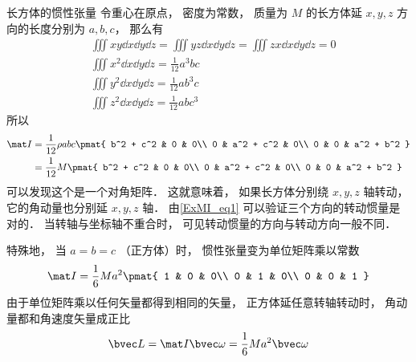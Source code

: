 \begin{example}{长方体的惯性张量}\label{ITensr_ex1}
令重心在原点， 密度为常数， 质量为 $M$ 的长方体延 $x, y, z$ 方向的长度分别为 $a, b, c$， 那么有
\begin{equation}
\begin{aligned}
&\iiint xy \dd{x}\dd{y}\dd{z} = \iiint yz \dd{x}\dd{y}\dd{z} = \iiint zx \dd{x}\dd{y}\dd{z} = 0\\
&\iiint x^2 \dd{x}\dd{y}\dd{z} = \frac{1}{12} a^3 bc\\
&\iiint y^2 \dd{x}\dd{y}\dd{z} = \frac{1}{12} ab^3 c\\
&\iiint z^2 \dd{x}\dd{y}\dd{z} = \frac{1}{12} ab c^3
\end{aligned}
\end{equation}
所以
\begin{equation}\label{ITensr_eq4}
\begin{aligned}
\mat I &= \frac{1}{12} \rho abc
\pmat{
   b^2 + c^2 & 0 & 0\\
   0 & a^2 + c^2 & 0\\
   0 & 0 & a^2 + b^2
}\\
&= \frac{1}{12} M
\pmat{
   b^2 + c^2 & 0 & 0\\
   0 & a^2 + c^2 & 0\\
   0 & 0 & a^2 + b^2
}
\end{aligned}
\end{equation}
可以发现这个是一个对角矩阵． 这就意味着， 如果长方体分别绕 $x, y, z$ 轴转动， 它的角动量也分别延 $x, y, z$ 轴． 由\autoref{ExMI_eq1} 可以验证三个方向的转动惯量是对的． 当转轴与坐标轴不重合时， 可见转动惯量的方向与转动方向一般不同．

特殊地， 当 $a = b = c$ （正方体）时， 惯性张量变为单位矩阵乘以常数
\begin{equation}
\mat I = \frac{1}{6} Ma^2
\pmat{
   1 & 0 & 0\\
   0 & 1 & 0\\
   0 & 0 & 1
}
\end{equation}
由于单位矩阵乘以任何矢量都得到相同的矢量， 正方体延任意转轴转动时， 角动量都和角速度矢量成正比
\begin{equation}
\bvec L = \mat I \bvec \omega = \frac{1}{6} Ma^2 \bvec \omega
\end{equation}
\end{example}

